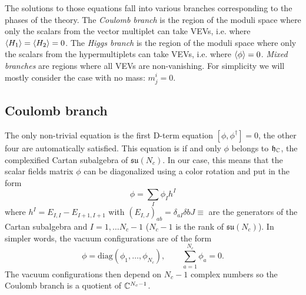     The solutions to those equations fall into various branches corresponding to the phases of the theory. The \emph{Coulomb branch} is the region of the moduli space where only the scalars from the vector multiplet can take VEVs, i.e. where $\langle H_1\rangle=\langle H_2\rangle=0$. The \emph{Higgs branch} is the region of the moduli space where only the scalars from the hypermultiplets can take VEVs, i.e. where $\langle\phi\rangle=0$. \emph{Mixed branches} are regions where all VEVs are non-vanishing. For simplicity we will mostly consider the case with no mass: $m^i_j=0$.

    \subsection{Coulomb branch}

        The only non-trivial equation is the first D-term equation $[\phi,\phi^\dagger]=0$, the other four are automatically satisfied. This equation is if and only $\phi$ belongs to $\mathfrak{h}_{\mathbb{C}}$, the complexified Cartan subalgebra of $\mathfrak{su}(N_c)$. In our case, this means that the scalar fields matrix $\phi$ can be diagonalized using a color rotation and put in the form
        \begin{equation}
            \phi = \sum_I \phi_Ih^I
        \end{equation}
        where $h^I=E_{I,I}-E_{I+1,I+1}$ with $(E_{I,J})_{ab}=\delta_{aI}\delta{bJ}\equiv$ are the generators of the Cartan subalgebra and $I=1,\dots N_c-1$ ($N_c-1$ is the rank of $\mathfrak{su}(N_c)$). In simpler words, the vacuum configurations are of the form
        \begin{equation}
            \phi=\text{diag}(\phi_1,\dots,\phi_{N_c}),\qquad \sum^{N_c}_{a=1}\phi_a=0.\label{eq:diagform}
        \end{equation}
        The vacuum configurations then depend on $N_c-1$ complex numbers so the Coulomb branch is a quotient of $\mathbb{C}^{N_c-1}$.
        
